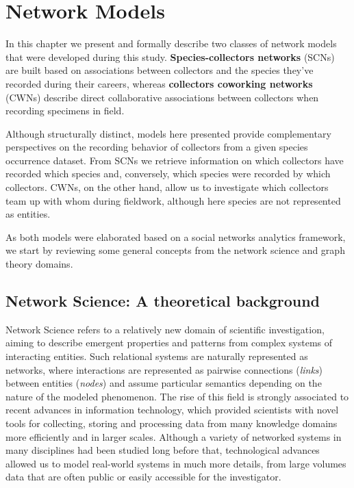 \chapter{Network Models}\label{network_models}


In this chapter we present and formally describe two classes of network models that were developed during this study.
\textbf{Species-collectors networks} (SCNs) are built based on associations between collectors and the species they've recorded during their careers, whereas \textbf{collectors coworking networks} (CWNs) describe direct collaborative associations between collectors when recording specimens in field.

Although structurally distinct, models here presented provide complementary perspectives on the recording behavior of collectors from a given species occurrence dataset. 
From SCNs we retrieve information on which collectors have recorded which species and, conversely, which species were recorded by which collectors. 
CWNs, on the other hand, allow us to investigate which collectors team up with whom during fieldwork, although here species are not represented as entities.

As both models were elaborated based on a social networks analytics framework, we start by reviewing some general concepts from the network science and graph theory domains.




\section{Network Science: A theoretical background}

Network Science refers to a relatively new domain of scientific investigation, aiming to describe emergent properties and patterns from complex systems of interacting entities.
Such relational systems are naturally represented as networks, where interactions are represented as pairwise connections (\textit{links}) between entities (\textit{nodes}) and assume particular semantics depending on the nature of the modeled phenomenon.
The rise of this field is strongly associated to recent advances in information technology, which provided scientists with novel tools for collecting, storing and processing data from many knowledge domains more efficiently and in larger scales.
Although a variety of networked systems in many disciplines had been studied long before that, technological advances allowed us to model real-world systems in much more details, from large volumes data that are often public or easily accessible for the investigator.

